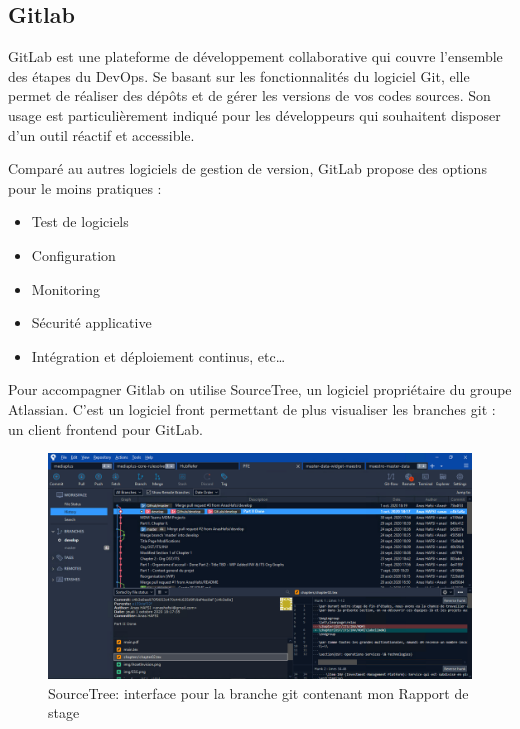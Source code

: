 \subsection{Gitlab} 
\par GitLab est une plateforme de développement collaborative qui couvre l’ensemble des étapes du DevOps. Se basant sur les fonctionnalités du logiciel Git, elle permet de réaliser des dépôts et de gérer les versions de vos codes sources. Son usage est particulièrement indiqué pour les développeurs qui souhaitent disposer d’un outil réactif et accessible.
\par Comparé au autres logiciels de gestion de version, GitLab propose des options pour le moins pratiques :
\begin{itemize}
    \item Test de logiciels
    \item Configuration
    \item Monitoring
    \item Sécurité applicative
    \item Intégration et déploiement continus, etc\dots
\end{itemize}
\par Pour accompagner Gitlab on utilise SourceTree, un logiciel propriétaire du groupe Atlassian. C'est un logiciel front permettant de plus visualiser les branches git : un client frontend pour GitLab.
\begin{figure}[ht]
    \centering
    \includegraphics[width=\columnwidth]{img/sourcetree.png}
    \caption{SourceTree: interface pour la branche git contenant mon Rapport de stage}
\end{figure}
\clearpage
